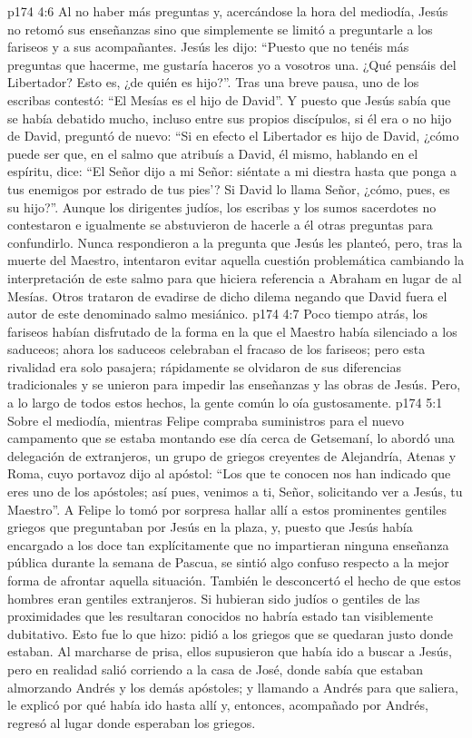 \vs p174 4:6 Al no haber más preguntas y, acercándose la hora del mediodía, Jesús no retomó sus enseñanzas sino que simplemente se limitó a preguntarle a los fariseos y a sus acompañantes. Jesús les dijo: “Puesto que no tenéis más preguntas que hacerme, me gustaría haceros yo a vosotros una. ¿Qué pensáis del Libertador? Esto es, ¿de quién es hijo?”. Tras una breve pausa, uno de los escribas contestó: “El Mesías es el hijo de David”. Y puesto que Jesús sabía que se había debatido mucho, incluso entre sus propios discípulos, si él era o no hijo de David, preguntó de nuevo: “Si en efecto el Libertador es hijo de David, ¿cómo puede ser que, en el salmo que atribuís a David, él mismo, hablando en el espíritu, dice: “El Señor dijo a mi Señor: siéntate a mi diestra hasta que ponga a tus enemigos por estrado de tus pies’? Si David lo llama Señor, ¿cómo, pues, es su hijo?”. Aunque los dirigentes judíos, los escribas y los sumos sacerdotes no contestaron e igualmente se abstuvieron de hacerle a él otras preguntas para confundirlo. Nunca respondieron a la pregunta que Jesús les planteó, pero, tras la muerte del Maestro, intentaron evitar aquella cuestión problemática cambiando la interpretación de este salmo para que hiciera referencia a Abraham en lugar de al Mesías. Otros trataron de evadirse de dicho dilema negando que David fuera el autor de este denominado salmo mesiánico.
\vs p174 4:7 Poco tiempo atrás, los fariseos habían disfrutado de la forma en la que el Maestro había silenciado a los saduceos; ahora los saduceos celebraban el fracaso de los fariseos; pero esta rivalidad era solo pasajera; rápidamente se olvidaron de sus diferencias tradicionales y se unieron para impedir las enseñanzas y las obras de Jesús. Pero, a lo largo de todos estos hechos, la gente común lo oía gustosamente.
\vs p174 5:1 Sobre el mediodía, mientras Felipe compraba suministros para el nuevo campamento que se estaba montando ese día cerca de Getsemaní, lo abordó una delegación de extranjeros, un grupo de griegos creyentes de Alejandría, Atenas y Roma, cuyo portavoz dijo al apóstol: “Los que te conocen nos han indicado que eres uno de los apóstoles; así pues, venimos a ti, Señor, solicitando ver a Jesús, tu Maestro”. A Felipe lo tomó por sorpresa hallar allí a estos prominentes gentiles griegos que preguntaban por Jesús en la plaza, y, puesto que Jesús había encargado a los doce tan explícitamente que no impartieran ninguna enseñanza pública durante la semana de Pascua, se sintió algo confuso respecto a la mejor forma de afrontar aquella situación. También le desconcertó el hecho de que estos hombres eran gentiles extranjeros. Si hubieran sido judíos o gentiles de las proximidades que les resultaran conocidos no habría estado tan visiblemente dubitativo. Esto fue lo que hizo: pidió a los griegos que se quedaran justo donde estaban. Al marcharse de prisa, ellos supusieron que había ido a buscar a Jesús, pero en realidad salió corriendo a la casa de José, donde sabía que estaban almorzando Andrés y los demás apóstoles; y llamando a Andrés para que saliera, le explicó por qué había ido hasta allí y, entonces, acompañado por Andrés, regresó al lugar donde esperaban los griegos.
